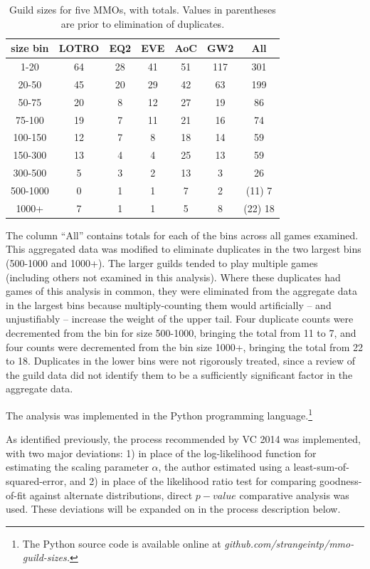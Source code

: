 \documentclass[pdftex,12pt]{llncs}
\begin{document}
\begin{table}
	\centering	
	\caption{Guild sizes for five MMOs, with totals.  Values in parentheses are prior to elimination of duplicates.}
	\begin{tabular}{|c|c|c|c|c|c|c|}
		\hline 
		size bin & LOTRO & EQ2 & EVE & AoC & GW2 & All \\ 
		\hline 
		1-20 & 64 & 28 & 41 & 51 & 117 & 301 \\ 
		\hline 
		20-50 & 45 & 20 & 29 & 42 & 63 & 199 \\ 
		\hline 
		50-75 & 20 & 8 & 12 & 27 & 19 & 86 \\ 
		\hline 
		75-100 & 19 & 7 & 11 & 21 & 16 & 74 \\ 
		\hline 
		100-150 & 12 & 7 & 8 & 18 & 14 & 59 \\ 
		\hline 
		150-300 & 13 & 4 & 4 & 25 & 13 & 59 \\ 
		\hline 
		300-500 & 5 & 3 & 2 & 13 & 3 & 26 \\ 
		\hline 
		500-1000 & 0 & 1 & 1 & 7 & 2 & (11) 7 \\ 
		\hline 
		1000+ & 7 & 1 & 1 & 5 & 8 & (22) 18 \\ 
		\hline 
	\end{tabular}
	\label{tab:mmoguildsizes}
\end{table}

The column “All” contains totals for each of the bins across all games examined.  This aggregated data was modified to eliminate duplicates in the two largest bins (500-1000 and 1000+).
The larger guilds tended to play multiple games (including others not examined in this analysis).
Where these duplicates had games of this analysis in common, they were eliminated from the aggregate data in the largest bins because multiply-counting them would artificially – and unjustifiably – increase the weight of the upper tail.
Four duplicate counts were decremented from the bin for size 500-1000, bringing the total from 11 to 7, and four counts were decremented from the bin size 1000+, bringing the total from 22 to 18.
Duplicates in the lower bins were not rigorously treated, since a review of the guild data did not identify them to be a sufficiently significant factor in the aggregate data.

The analysis was implemented in the Python programming language.\footnote{The Python source code is available online at \textit{github.com/strangeintp/mmo-guild-sizes.}}

As identified previously, the process recommended by VC 2014 was implemented, with two major deviations:  1) in place of the log-likelihood function for estimating the scaling parameter $\alpha$, the author estimated using a least-sum-of-squared-error, and 2) in place of the likelihood ratio test for comparing goodness-of-fit against alternate distributions, direct $p-value$ comparative analysis was used.
These deviations will be expanded on in the process description below.
\end{document}
